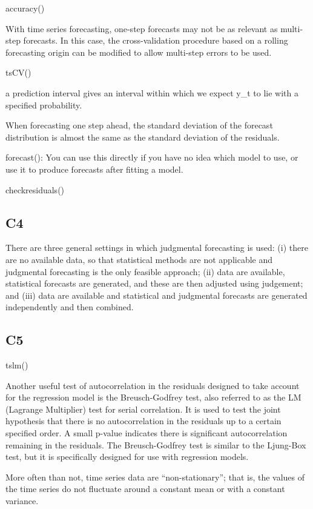 \documentclass[]{book}
\begin{document}
accuracy()

With time series forecasting, one-step forecasts may not be as relevant
as multi-step forecasts. In this case, the cross-validation procedure
based on a rolling forecasting origin can be modified to allow
multi-step errors to be used.

tsCV()

a prediction interval gives an interval within which we expect y\_t to
lie with a specified probability.

When forecasting one step ahead, the standard deviation of the forecast
distribution is almost the same as the standard deviation of the
residuals.

forecast(): You can use this directly if you have no idea which model to
use, or use it to produce forecasts after fitting a model.

checkresiduals()

\subsection{C4}\label{c4}

There are three general settings in which judgmental forecasting is
used: (i) there are no available data, so that statistical methods are
not applicable and judgmental forecasting is the only feasible approach;
(ii) data are available, statistical forecasts are generated, and these
are then adjusted using judgement; and (iii) data are available and
statistical and judgmental forecasts are generated independently and
then combined.

\subsection{C5}\label{c5}

tslm()

Another useful test of autocorrelation in the residuals designed to take
account for the regression model is the Breusch-Godfrey test, also
referred to as the LM (Lagrange Multiplier) test for serial correlation.
It is used to test the joint hypothesis that there is no autocorrelation
in the residuals up to a certain specified order. A small p-value
indicates there is significant autocorrelation remaining in the
residuals. The Breusch-Godfrey test is similar to the Ljung-Box test,
but it is specifically designed for use with regression models.

More often than not, time series data are ``non-stationary''; that is,
the values of the time series do not fluctuate around a constant mean or
with a constant variance.
\end{document}
